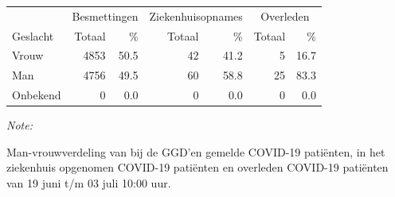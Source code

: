 \documentclass[
  english,
  man,floatsintext]{apa6}
\begin{document}
\begin{table}
\centering\begingroup\fontsize{11}{13}\selectfont

\begin{threeparttable}
\begin{tabular}{lrrrrrr}
\toprule
\multicolumn{1}{c}{ } & \multicolumn{2}{c}{Besmettingen} & \multicolumn{2}{c}{Ziekenhuisopnames} & \multicolumn{2}{c}{Overleden} \\
\cmidrule(l{3pt}r{3pt}){2-3} \cmidrule(l{3pt}r{3pt}){4-5} \cmidrule(l{3pt}r{3pt}){6-7}
Geslacht & Totaal & \% & Totaal & \% & Totaal & \%\\
\midrule
Vrouw & 4853 & 50.5 & 42 & 41.2 & 5 & 16.7\\
Man & 4756 & 49.5 & 60 & 58.8 & 25 & 83.3\\
Onbekend & 0 & 0.0 & 0 & 0.0 & 0 & 0.0\\
\bottomrule
\end{tabular}
\begin{tablenotes}
\item \textit{Note: } 
\item Man-vrouwverdeling van bij de GGD’en gemelde COVID-19 patiënten, in het ziekenhuis opgenomen COVID-19 patiënten en overleden COVID-19 patiënten van 19 juni t/m 03 juli 10:00 uur.
\end{tablenotes}
\end{threeparttable}
\endgroup{}
\end{table}
\newpage
\end{document}
